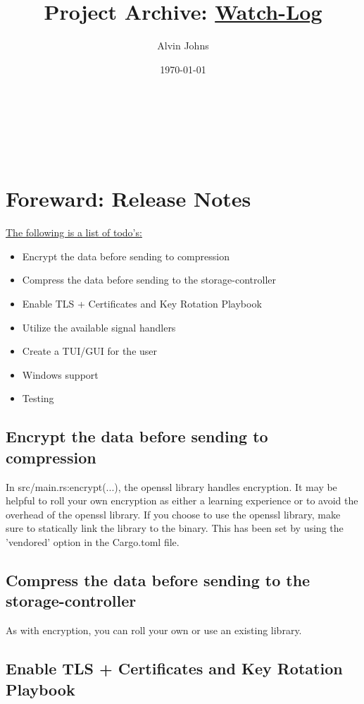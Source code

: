 \documentclass{article}
\title{Project Archive: \underline{Watch-Log}}
\author{Alvin Johns}
\date{\today}
\makeatletter
\renewcommand{\maketitle}{
    \begin{titlepage}
        \centering
        \vspace*{\fill}
        \large \textbf{\@title} \\
        \vspace{0.5cm}
        \normalsize \textbf{\@author}\\
        \vspace{0.5cm}
        \normalsize \textbf{\@date} \\
        \vspace*{\fill}
    \end{titlepage}
}
\makeatother
\begin{document}
\maketitle

\newpage

\tableofcontents

\newpage

\raggedright

\section{Foreward: Release Notes}

\underline{The following is a list of todo's:}

\begin{itemize}[label=+]
    \item{Encrypt the data before sending to compression}
    \item{Compress the data before sending to the storage-controller}
    \item{Enable TLS + Certificates and Key Rotation Playbook}
    \item{Utilize the available signal handlers}
    \item{Create a TUI/GUI for the user}
    \item{Windows support}
    \item{Testing}
\end{itemize}

\subsection{Encrypt the data before sending to compression}

In src/main.rs:encrypt(...), the openssl library handles encryption. It may be helpful to roll your own encryption as either a learning experience or to avoid the overhead of the openssl library. If you choose to use the openssl library, make sure to statically link the library to the binary. This has been set by using the 'vendored' option in the Cargo.toml file.

\subsection{Compress the data before sending to the storage-controller}

As with encryption, you can roll your own or use an existing library.

\subsection{Enable TLS + Certificates and Key Rotation Playbook}
\end{document}
